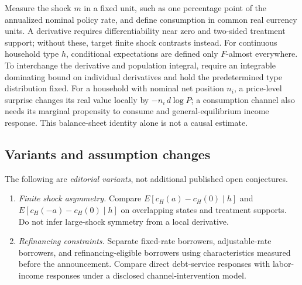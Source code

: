 \documentclass[11pt,a4paper]{article}
\begin{document}
Measure the shock \(m\) in a fixed unit, such as one percentage point of the annualized nominal policy rate, and define consumption in common real currency units. A derivative requires differentiability near zero and two-sided treatment support; without these, target finite shock contrasts instead. For continuous household type \(h\), conditional expectations are defined only \(F\)-almost everywhere. To interchange the derivative and population integral, require an integrable dominating bound on individual derivatives and hold the predetermined type distribution fixed. For a household with nominal net position \(n_i\), a price-level surprise changes its real value locally by \(-n_i\,d\log P\); a consumption channel also needs its marginal propensity to consume and general-equilibrium income response. This balance-sheet identity alone is not a causal estimate.
\subsection*{Variants and assumption changes}
The following are \emph{editorial variants}, not additional published open conjectures.
\begin{enumerate}
\item \emph{Finite shock asymmetry.} Compare \(E[c_H(a)-c_H(0)\mid h]\) and \(E[c_H(-a)-c_H(0)\mid h]\) on overlapping states and treatment supports. Do not infer large-shock symmetry from a local derivative.
\item \emph{Refinancing constraints.} Separate fixed-rate borrowers, adjustable-rate borrowers, and refinancing-eligible borrowers using characteristics measured before the announcement. Compare direct debt-service responses with labor-income responses under a disclosed channel-intervention model.
\end{enumerate}
\end{document}
